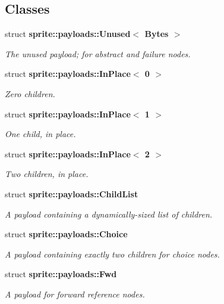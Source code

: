 \subsection*{Classes}
\begin{CompactItemize}
\item 
struct {\bf sprite::payloads::Unused$<$ Bytes $>$}
\begin{CompactList}\small\item\em The unused payload; for abstract and failure nodes. \item\end{CompactList}\item 
struct {\bf sprite::payloads::In\-Place$<$ 0 $>$}
\begin{CompactList}\small\item\em Zero children. \item\end{CompactList}\item 
struct {\bf sprite::payloads::In\-Place$<$ 1 $>$}
\begin{CompactList}\small\item\em One child, in place. \item\end{CompactList}\item 
struct {\bf sprite::payloads::In\-Place$<$ 2 $>$}
\begin{CompactList}\small\item\em Two children, in place. \item\end{CompactList}\item 
struct {\bf sprite::payloads::Child\-List}
\begin{CompactList}\small\item\em A payload containing a dynamically-sized list of children. \item\end{CompactList}\item 
struct {\bf sprite::payloads::Choice}
\begin{CompactList}\small\item\em A payload containing exactly two children for choice nodes. \item\end{CompactList}\item 
struct {\bf sprite::payloads::Fwd}
\begin{CompactList}\small\item\em A payload for forward reference nodes. \item\end{CompactList}\item 

\end{CompactItemize}
